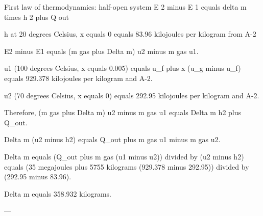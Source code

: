 First law of thermodynamics: half-open system  
E 2 minus E 1 equals delta m times h 2 plus Q out  

h at 20 degrees Celsius, x equals 0 equals 83.96 kilojoules per kilogram from A-2

E2 minus E1 equals (m gas plus Delta m) u2 minus m gas u1.

u1 (100 degrees Celsius, x equals 0.005) equals u_f plus x (u_g minus u_f) equals 929.378 kilojoules per kilogram and A-2.

u2 (70 degrees Celsius, x equals 0) equals 292.95 kilojoules per kilogram and A-2.

Therefore, (m gas plus Delta m) u2 minus m gas u1 equals Delta m h2 plus Q_out.

Delta m (u2 minus h2) equals Q_out plus m gas u1 minus m gas u2.

Delta m equals (Q_out plus m gas (u1 minus u2)) divided by (u2 minus h2) equals (35 megajoules plus 5755 kilograms (929.378 minus 292.95)) divided by (292.95 minus 83.96).

Delta m equals 358.932 kilograms.

---